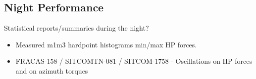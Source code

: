 \subsection{Night Performance}

Statistical reports/summaries during the night?
\begin{itemize}
    \item Measured m1m3 hardpoint histograms min/max HP forces.
    \item FRACAS-158 / SITCOMTN-081 / SITCOM-1758 - Oscillations on HP forces and on azimuth torques
\end{itemize}
